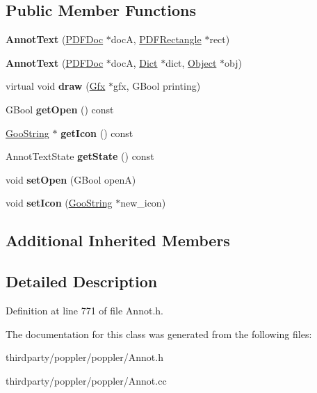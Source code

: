 \subsection*{Public Member Functions}
\begin{DoxyCompactItemize}
\item 
\mbox{\label{class_annot_text_a4b381612d1714e8f33f7406271a7a94b}} 
{\bfseries Annot\+Text} (\hyperlink{class_p_d_f_doc}{P\+D\+F\+Doc} $\ast$docA, \hyperlink{class_p_d_f_rectangle}{P\+D\+F\+Rectangle} $\ast$rect)
\item 
\mbox{\label{class_annot_text_a01eeed6529af47a288d8fe61f00ea630}} 
{\bfseries Annot\+Text} (\hyperlink{class_p_d_f_doc}{P\+D\+F\+Doc} $\ast$docA, \hyperlink{class_dict}{Dict} $\ast$dict, \hyperlink{class_object}{Object} $\ast$obj)
\item 
\mbox{\label{class_annot_text_aa9ff412602892a9d938d916956474078}} 
virtual void {\bfseries draw} (\hyperlink{class_gfx}{Gfx} $\ast$gfx, G\+Bool printing)
\item 
\mbox{\label{class_annot_text_a6a2cacec5084be72fa007094242f021f}} 
G\+Bool {\bfseries get\+Open} () const
\item 
\mbox{\label{class_annot_text_a7a36b886b3e5218f69a6a69636abac21}} 
\hyperlink{class_goo_string}{Goo\+String} $\ast$ {\bfseries get\+Icon} () const
\item 
\mbox{\label{class_annot_text_acc5c780ba603e7f301d6c007de1bf268}} 
Annot\+Text\+State {\bfseries get\+State} () const
\item 
\mbox{\label{class_annot_text_af5eb2d7a09f1019925d2c907978063d9}} 
void {\bfseries set\+Open} (G\+Bool openA)
\item 
\mbox{\label{class_annot_text_a5e099464ab8d869240d481f067087ba2}} 
void {\bfseries set\+Icon} (\hyperlink{class_goo_string}{Goo\+String} $\ast$new\+\_\+icon)
\end{DoxyCompactItemize}
\subsection*{Additional Inherited Members}


\subsection{Detailed Description}


Definition at line 771 of file Annot.\+h.



The documentation for this class was generated from the following files\+:\begin{DoxyCompactItemize}
\item 
thirdparty/poppler/poppler/Annot.\+h\item 
thirdparty/poppler/poppler/Annot.\+cc\end{DoxyCompactItemize}
